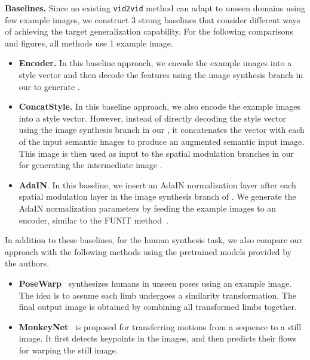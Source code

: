 \documentclass{article}
\newcommand{\vidtovid}{{\texttt{vid2vid}}\xspace}
\begin{document}
{\bf Baselines.} Since no existing \vidtovid method can adapt to unseen domains using few example images, we construct 3 strong baselines that consider different ways of achieving the target generalization capability. For the following comparisons and figures, all methods use 1 example image. 
\begin{itemize}[leftmargin=5mm,topsep=0pt]
\item {\bf Encoder.} In this baseline approach, we encode the example images into a style vector and then decode the features using the image synthesis branch in our  to generate . 
\item {\bf ConcatStyle.} In this baseline approach, we also encode the example images into a style vector. However, instead of directly decoding the style vector using the image synthesis branch in our , it concatenates the vector with each of the input semantic images to produce an augmented semantic input image. This image is then used as input to the spatial modulation branches in our  for generating the intermediate image .
\item {\bf AdaIN}. In this baseline, we insert an AdaIN normalization layer after each spatial modulation layer in the image synthesis branch of . We generate the AdaIN normalization parameters by feeding the example images to an encoder, similar to the FUNIT method~\cite{liu2019few}. 
\end{itemize}
In addition to these baselines, for the human synthesis task, we also compare our approach with the following methods using the pretrained models provided by the authors.
\begin{itemize}[leftmargin=5mm,topsep=0pt]
\item {\bf PoseWarp}~\cite{balakrishnan2018synthesizing} synthesizes humans in unseen poses using an example image. The idea is to assume each limb undergoes a similarity transformation. The final output image is obtained by combining all transformed limbs together.
\item {\bf MonkeyNet}~\cite{Siarohin2019monkeynet} is proposed for transferring motions from a sequence to a still image. It first detects keypoints in the images, and then predicts their flows for warping the still image.
\end{itemize}
\end{document}
